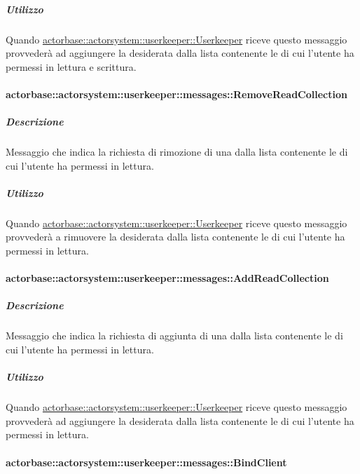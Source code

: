 \documentclass{scalatekids-article}
\begin{document}
\subparagraph{Utilizzo}

Quando \hyperref[sec:actorbase::actorsystem::userkeeper::Userkeeper]{actorbase::\allowbreak{}actorsystem::\allowbreak{}userkeeper::\allowbreak{}Userkeeper}
riceve questo messaggio provvederà ad aggiungere la  desiderata
dalla lista contenente le  di cui l'utente ha permessi in
lettura e scrittura.

\paragraph{actorbase::actorsystem::userkeeper::messages::RemoveReadCollection}
\label{sec:actorbase::actorsystem::userkeeper::messages::RemoveReadCollection}

\subparagraph{Descrizione}

Messaggio che indica la richiesta di rimozione di una  dalla
lista contenente le  di cui l'utente ha permessi in lettura.

\subparagraph{Utilizzo}

Quando \hyperref[sec:actorbase::actorsystem::userkeeper::Userkeeper]{actorbase::\allowbreak{}actorsystem::\allowbreak{}userkeeper::\allowbreak{}Userkeeper}
riceve questo messaggio provvederà a rimuovere la  desiderata
dalla lista contenente le  di cui l'utente ha permessi in
lettura.

\paragraph{actorbase::actorsystem::userkeeper::messages::AddReadCollection}
\label{sec:actorbase::actorsystem::userkeeper::messages::AddReadCollection}

\subparagraph{Descrizione}

Messaggio che indica la richiesta di aggiunta di una  dalla
lista contenente le  di cui l'utente ha permessi in lettura.

\subparagraph{Utilizzo}

Quando \hyperref[sec:actorbase::actorsystem::userkeeper::Userkeeper]{actorbase::\allowbreak{}actorsystem::\allowbreak{}userkeeper::\allowbreak{}Userkeeper}
riceve questo messaggio provvederà ad aggiungere la  desiderata
dalla lista contenente le  di cui l'utente ha permessi in
lettura.

\paragraph{actorbase::actorsystem::userkeeper::messages::BindClient}
\label{sec:actorbase::actorsystem::userkeeper::messages::BindClient}
\end{document}
